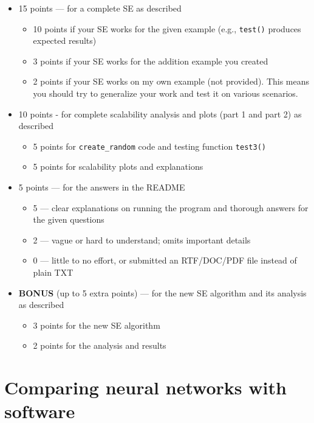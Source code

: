 \documentclass[oneside,11pt,dvipsnames]{book}
\numberwithin{equation}{section}
\theoremstyle{definition}
\theoremstyle{remark}
\begin{document}
\begin{itemize}
\item 15 points — for a complete SE as described
    \begin{itemize}
    \item 10 points if your SE works for the given example (e.g., \texttt{test()} produces expected results)
    \item 3 points if your SE works for the addition example you created
    \item 2 points if your SE works on my own example (not provided). This means you should try to generalize your work and test it on various scenarios.
    \end{itemize}
\item 10 points - for complete scalability analysis and plots (part 1 and part 2) as described
  \begin{itemize} 
    \item 5 points for \texttt{create\_random} code and testing function \texttt{test3()}
    \item 5 points for scalability plots and explanations    
  \end{itemize}
\item 5 points — for the answers in the README
    \begin{itemize}
    \item 5 — clear explanations on running the program and thorough answers for the given questions
    \item 2 — vague or hard to understand; omits important details
    \item 0 — little to no effort, or submitted an RTF/DOC/PDF file instead of plain TXT
    \end{itemize}
\item \textbf{BONUS} (up to 5 extra points) — for the new SE algorithm and its analysis as described
    \begin{itemize}
    \item 3 points for the new SE algorithm
    \item 2 points for the analysis and results
    \end{itemize}
\end{itemize}

\renewcommand{\appendixname}{Appendix}
\appendix

\chapter{Comparing neural networks with software}\label{app:nn-vs-software}
\end{document}
